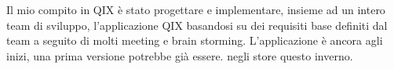 Il mio compito in QIX è stato progettare e implementare, insieme ad un intero team di sviluppo, 
l'applicazione QIX basandosi su dei requisiti base definiti dal team a seguito di molti meeting 
e brain storming. L'applicazione è ancora agli inizi, una prima versione potrebbe già essere.
negli store questo inverno.